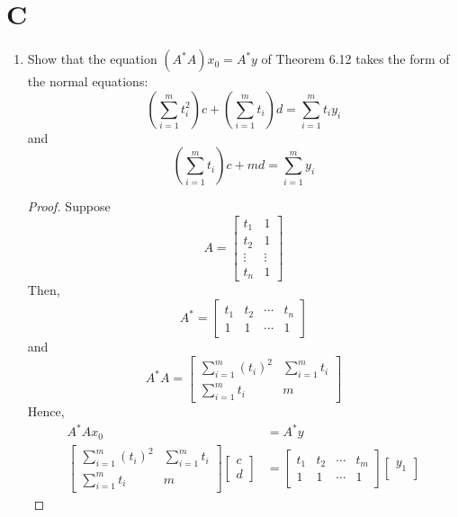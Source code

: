 \documentclass[11pt]{scrartcl}
\begin{document}
\section{C}
\begin{enumerate}[label=\alph*.]
	\item{
	      Show that the equation $\left(A^{*} A\right) x_{0}=A^{*} y$ of Theorem 6.12 takes the form of the normal equations:
	      $$\left(\sum_{i=1}^{m} t_{i}^{2}\right) c+\left(\sum_{i=1}^{m} t_{i}\right) d=\sum_{i=1}^{m} t_{i} y_{i}$$
	      and
	      $$\left(\sum_{i=1}^{m} t_{i}\right) c+m d=\sum_{i=1}^{m} y_{i}$$
	      \begin{proof}
		      Suppose $$ A = \begin{bmatrix}
				      t_1    & 1      \\
				      t_2    & 1      \\
				      \vdots & \vdots \\
				      t_n    & 1
			      \end{bmatrix}$$
		      Then,
		      $$ A^* = \begin{bmatrix}
				      t_1 & t_2 & \cdots & t_n \\
				      1   & 1   & \cdots & 1
			      \end{bmatrix}$$
		      and
		      $$ A^*A = \begin{bmatrix}
				      \sum_{i = 1}^{m} (t_i)^2 & \sum_{i = 1}^{m} t_i \\
				      \sum_{i = 1}^{m} t_i     & m
			      \end{bmatrix}$$
		      Hence,
		      \begin{align*}
			      A^*Ax_0 & = A^*y                            \\
			      \begin{bmatrix}
				      \sum_{i = 1}^{m} (t_i)^2 & \sum_{i = 1}^{m} t_i \\
				      \sum_{i = 1}^{m} t_i     & m
			      \end{bmatrix}
			      \begin{bmatrix}
				      c \\
				      d
			      \end{bmatrix}
			              & =      \begin{bmatrix}
				      t_1 & t_2 & \cdots & t_m \\
				      1   & 1   & \cdots & 1
			      \end{bmatrix}
			      \begin{bmatrix}
				      y_1    \\

\end{bmatrix}
\end{align*}
\end{proof}}
\end{enumerate}
\end{document}
